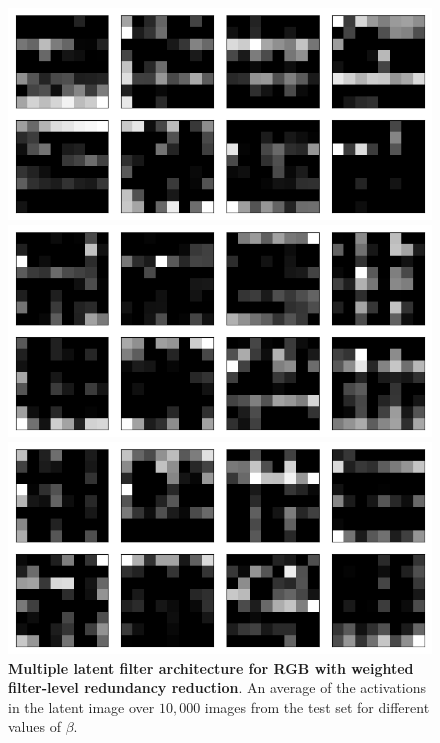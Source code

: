 \begin{figure}[h!]
\centering
\captionsetup{justification=centering}

    \includegraphics[scale=0.42]{figures/results/colour_separated/beta_1_average_activation.png}
    \caption{$\beta=1$}
    \includegraphics[scale=0.42]{figures/results/colour_separated/beta_2_average_activation.png}
    \caption{$\beta=2$}
    \includegraphics[scale=0.42]{figures/results/colour_separated/beta_4_average_activation.png}
    \caption{$\beta=4$}

\caption{\textbf{Multiple latent filter architecture for RGB with weighted filter-level redundancy reduction}. An average of the activations in the latent image over $10,000$ images from the test set for different values of $\beta$.}
\label{fig:colour_separated_average_filters}
\end{figure}
